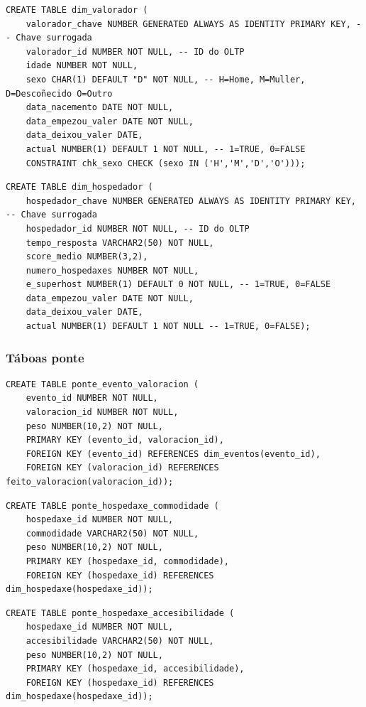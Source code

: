 \documentclass[12pt,a4paper]{article}
\begin{document}
\begin{lstlisting}
CREATE TABLE dim_valorador (
    valorador_chave NUMBER GENERATED ALWAYS AS IDENTITY PRIMARY KEY, -- Chave surrogada
    valorador_id NUMBER NOT NULL, -- ID do OLTP
    idade NUMBER NOT NULL,
    sexo CHAR(1) DEFAULT "D" NOT NULL, -- H=Home, M=Muller, D=Descoñecido O=Outro
    data_nacemento DATE NOT NULL,
    data_empezou_valer DATE NOT NULL,
    data_deixou_valer DATE,
    actual NUMBER(1) DEFAULT 1 NOT NULL, -- 1=TRUE, 0=FALSE
    CONSTRAINT chk_sexo CHECK (sexo IN ('H','M','D','O')));
\end{lstlisting}

\begin{lstlisting}
CREATE TABLE dim_hospedador (
    hospedador_chave NUMBER GENERATED ALWAYS AS IDENTITY PRIMARY KEY, -- Chave surrogada
    hospedador_id NUMBER NOT NULL, -- ID do OLTP
    tempo_resposta VARCHAR2(50) NOT NULL,
    score_medio NUMBER(3,2), 
    numero_hospedaxes NUMBER NOT NULL,
    e_superhost NUMBER(1) DEFAULT 0 NOT NULL, -- 1=TRUE, 0=FALSE
    data_empezou_valer DATE NOT NULL,
    data_deixou_valer DATE,
    actual NUMBER(1) DEFAULT 1 NOT NULL -- 1=TRUE, 0=FALSE);
\end{lstlisting}

\subsubsection{Táboas ponte}

\begin{lstlisting}
CREATE TABLE ponte_evento_valoracion (
    evento_id NUMBER NOT NULL,
    valoracion_id NUMBER NOT NULL,
    peso NUMBER(10,2) NOT NULL, 
    PRIMARY KEY (evento_id, valoracion_id),
    FOREIGN KEY (evento_id) REFERENCES dim_eventos(evento_id),
    FOREIGN KEY (valoracion_id) REFERENCES feito_valoracion(valoracion_id));
\end{lstlisting}

\begin{lstlisting}
CREATE TABLE ponte_hospedaxe_commodidade (
    hospedaxe_id NUMBER NOT NULL,
    commodidade VARCHAR2(50) NOT NULL,
    peso NUMBER(10,2) NOT NULL, 
    PRIMARY KEY (hospedaxe_id, commodidade),
    FOREIGN KEY (hospedaxe_id) REFERENCES dim_hospedaxe(hospedaxe_id));
\end{lstlisting}

\begin{lstlisting}
CREATE TABLE ponte_hospedaxe_accesibilidade (
    hospedaxe_id NUMBER NOT NULL,
    accesibilidade VARCHAR2(50) NOT NULL,
    peso NUMBER(10,2) NOT NULL, 
    PRIMARY KEY (hospedaxe_id, accesibilidade),
    FOREIGN KEY (hospedaxe_id) REFERENCES dim_hospedaxe(hospedaxe_id));
\end{lstlisting}
\end{document}
